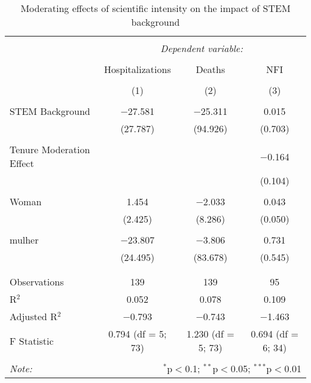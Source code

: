 
\begin{table}[!htbp] \centering 
  \caption{Moderating effects of scientific intensity on the impact of STEM background} 
  \label{} 
\begin{tabular}{@{\extracolsep{5pt}}lccc} 
\\[-1.8ex]\hline 
\hline \\[-1.8ex] 
 & \multicolumn{3}{c}{\textit{Dependent variable:}} \\ 
\cline{2-4} 
\\[-1.8ex] & Hospitalizations & Deaths & NFI \\ 
\\[-1.8ex] & (1) & (2) & (3)\\ 
\hline \\[-1.8ex] 
 STEM Background & $-$27.581 & $-$25.311 & 0.015 \\ 
  & (27.787) & (94.926) & (0.703) \\ 
  & & & \\ 
 Tenure Moderation Effect &  &  & $-$0.164 \\ 
  &  &  & (0.104) \\ 
  & & & \\ 
 Woman & 1.454 & $-$2.033 & 0.043 \\ 
  & (2.425) & (8.286) & (0.050) \\ 
  & & & \\ 
 mulher & $-$23.807 & $-$3.806 & 0.731 \\ 
  & (24.495) & (83.678) & (0.545) \\ 
  & & & \\ 
\hline \\[-1.8ex] 
Observations & 139 & 139 & 95 \\ 
R$^{2}$ & 0.052 & 0.078 & 0.109 \\ 
Adjusted R$^{2}$ & $-$0.793 & $-$0.743 & $-$1.463 \\ 
F Statistic & 0.794 (df = 5; 73) & 1.230 (df = 5; 73) & 0.694 (df = 6; 34) \\ 
\hline 
\hline \\[-1.8ex] 
\textit{Note:}  & \multicolumn{3}{r}{$^{*}$p$<$0.1; $^{**}$p$<$0.05; $^{***}$p$<$0.01} \\ 
\end{tabular} 
\end{table} 
